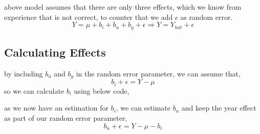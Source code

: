\documentclass[]{article}
\newenvironment{Shaded}{\begin{snugshade}}{\end{snugshade}}
\newcommand{\KeywordTok}[1]{\textcolor[rgb]{0.13,0.29,0.53}{\textbf{#1}}}
\newcommand{\DataTypeTok}[1]{\textcolor[rgb]{0.13,0.29,0.53}{#1}}
\newcommand{\StringTok}[1]{\textcolor[rgb]{0.31,0.60,0.02}{#1}}
\newcommand{\CommentTok}[1]{\textcolor[rgb]{0.56,0.35,0.01}{\textit{#1}}}
\newcommand{\OperatorTok}[1]{\textcolor[rgb]{0.81,0.36,0.00}{\textbf{#1}}}
\newcommand{\NormalTok}[1]{#1}
\begin{document}
above model assumes that there are only three effects, which we know
from experience that is not correct, to counter that we add \(\epsilon\)
as random error. \[
Y = \mu + b_i + b_u + b_y + \epsilon  \Rightarrow Y = Y_{hat}+\epsilon
\]

\subsection{Calculating Effects}\label{calculating-effects}

by including \(b_u\) and \(b_y\) in the random error parameter, we can
assume that, \[
b_i + \epsilon  = Y - \mu 
\] so we can calculate \(b_i\) using below code,

\begin{Shaded}
\end{Shaded}

\begin{Shaded}
\end{Shaded}

as we now have an estimation for \(b_i\), we can estimate \(b_u\) and
keep the year effect as part of our random error parameter, \[
b_u + \epsilon = Y - \mu - b_i
\]

\begin{Shaded}
\end{Shaded}
\end{document}
